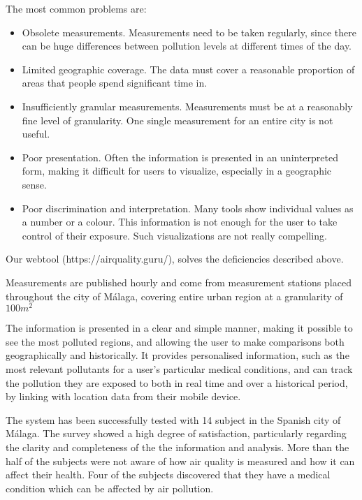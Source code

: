 The most common problems are:

\begin{itemize}

\item Obsolete measurements. Measurements need to be taken regularly, since there can be huge differences
between pollution levels at different times of the day.

\item Limited geographic coverage. The data must cover a reasonable proportion of areas that people spend significant time in.

\item Insufficiently granular measurements. Measurements must be at a reasonably fine level of granularity. One single measurement for an entire city is not useful.

\item Poor presentation. Often the information is presented in an uninterpreted form, making it difficult for users to visualize, especially in a geographic sense.

\item Poor discrimination and interpretation. Many tools show individual values as a number or a colour. This information is not
enough for the user to take control of their exposure. Such visualizations are not really compelling. 

\end{itemize}

Our webtool (https://airquality.guru/), solves the deficiencies described above.

Measurements are published hourly and come from measurement stations placed throughout the 
city of Málaga, covering entire urban region at a granularity of $100m^2$

The information is presented in a clear and simple manner, making it possible to see the most polluted regions,
and allowing the user to make comparisons both geographically and historically. It provides personalised information, such as the most relevant 
pollutants for a user's particular medical conditions, and can track
the pollution they are exposed to both in real time and over a historical period, by linking with location data from their mobile device. 

The system has been successfully tested with 14 subject in the Spanish city of Málaga. The survey showed a high degree of satisfaction, 
particularly regarding the clarity and completeness of the the information and analysis.
More than the half of the subjects were not aware of how air quality is measured and how it 
can affect their health. Four of the subjects discovered that they have a medical 
condition which can be affected by air pollution.
    
